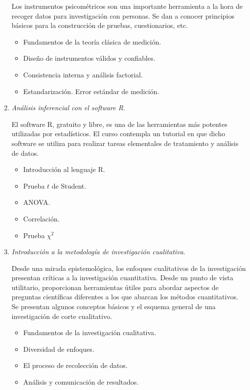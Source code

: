 \documentclass[letterpaper,11pt]{article}
\begin{document}
\begin{enumerate}
  Los instrumentos psicom\'etricos son una importante herramienta a la hora de recoger datos para investigaci\'on con personas. Se dan a conocer principios b\'asicos para la construcci\'on de pruebas, cuestionarios, etc.   
  \begin{itemize}
    \item Fundamentos de la teor\'ia cl\'asica de medici\'on.
    \item Dise\~no de instrumentos v\'alidos y confiables.
    \item Consistencia interna y an\'alisis factorial.
    \item Estandarizaci\'on. Error est\'andar de medici\'on.
  \end{itemize}

\item \emph{An\'alisis inferencial con el software R}.\label{it:r}

El software R, gratuito y libre, es una de las herramientas m\'as potentes utilizadas por estad\'isticos. El curso contempla un tutorial en que dicho software se utiliza para realizar tareas elementales de tratamiento y an\'alisis de datos.

  \begin{itemize}
    \item Introducci\'on al lenguaje R.
    \item Prueba $t$ de Student.
    \item ANOVA.
    \item Correlaci\'on.
    \item Prueba $\chi^2$
  \end{itemize}
  
  
  \item \emph{Introducci\'on a la metodolog\'ia de investigaci\'on cualitativa}.

    Desde una mirada epistemol\'ogica, los enfoques cualitativos de la investigaci\'on presentan cr\'iticas a la investigaci\'on cuantitativa. Desde un punto de vista utilitario, proporcionan herramientas \'utiles para abordar aspectos de preguntas cient\'ificas diferentes a los que abarcan los m\'etodos cuantitativos. Se presentan algunos conceptos b\'asicos y el esquema general de una investigaci\'on de corte cualitativo.
      
  \begin{itemize}
    \item Fundamentos de la investigaci\'on cualitativa.
    \item Diversidad de enfoques.
    \item El proceso de recolecci\'on de datos.
    \item An\'alisis y comunicaci\'on de resultados.
  \end{itemize}


\end{enumerate}
\end{document}
